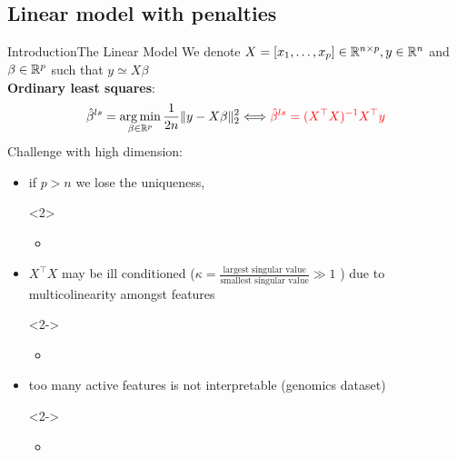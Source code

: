 \documentclass[10pt,aspectratio=43]{beamer}
\begin{document}
\subsection*{Linear model with penalties}
\begin{frame}{Introduction}{The Linear Model}
We denote $X = [x_1,\dots, x_p] \in \mathbb{R}^{n \times p}, y \in \mathbb{R}^n$ and
$\beta \in \mathbb{R}^p$ such that $y\simeq X\beta$ \\

\textbf{Ordinary least squares}:
\begin{align*}
    \hat\beta^{ls}
    =
    \mathop{\mathrm{arg\,min}}_{\beta\in\mathbb{R}^p}
    \frac{1}{2n}\|y-X\beta\|_2^2
    \Longleftrightarrow
    \textcolor{red}{
    \hat \beta^{ls} = (X^\top X)^{-1}X^\top y }
\end{align*}
Challenge with high dimension:
\begin{itemize}
\item if $p>n$ we lose the uniqueness,
\begin{onlyenv}<2>
    \begin{itemize}
        \item  \color{red}{make the problem strictly convex.}
    \end{itemize}
\end{onlyenv}
\item $X^\top X$ may be ill conditioned
($\kappa = \frac{\text{largest singular value}}{
    \text{smallest singular value}} \gg 1 $ )
    due to multicolinearity amongst features
\begin{onlyenv}<2->
    \begin{itemize}
        \item \color{red}{Shift spectrum by a small quantity using
        $\ell_2$ penalty}
    \end{itemize}
\end{onlyenv}
\item too many active features is not interpretable (genomics dataset)
\begin{onlyenv}<2->
    \begin{itemize}
        \item \color{red}{Feature selection using $\ell_1$ penalty}
    \end{itemize}
\end{onlyenv}\end{itemize}
\end{frame}
\end{document}

